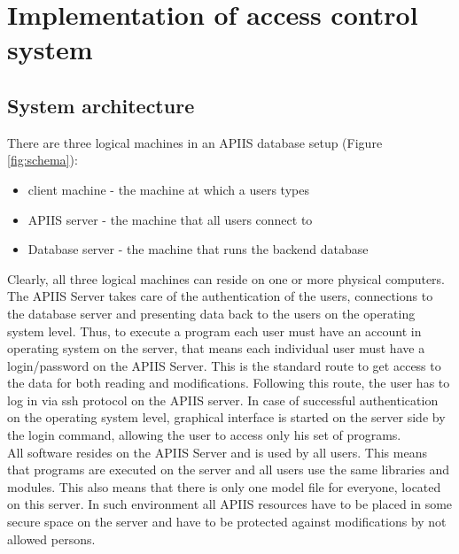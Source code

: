 \section{Implementation of access control system }

\subsection{System architecture}
There are three logical machines in an APIIS database setup (Figure \ref{fig:schema}): 
\begin{itemize}
\item client machine - the machine at which a users types 
\item APIIS server - the machine that all users connect to
\item Database server - the machine that runs the backend database
\end{itemize} 
Clearly, all three logical machines can reside on one or more physical computers.\\
The APIIS Server takes care of the authentication of the users, 
connections to the database server and presenting data back to the users on the operating
system level. Thus, to execute a program each user must have an account in operating system 
on the server, that means each individual user must have a login/password on the APIIS Server.
This is the standard route to get access to the data for both reading and modifications. 
Following this route, the user has to log in via ssh protocol on the APIIS server. 
In case of successful authentication on the operating system level, graphical interface is 
started on the server side by the login command, allowing the user to access only his 
set of programs.\\ 

All software resides on the APIIS Server and is used by all users. This means that programs are executed on the server and all users use the same libraries and modules. This also means that there is only one model file for everyone, located on this server. In such environment all APIIS resources have to be placed in some secure space on the server and have to be protected against modifications by not allowed persons.

